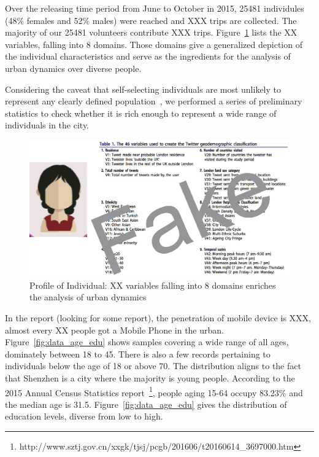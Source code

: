 Over the releasing time period from June to October in 2015, 25481 individules (48\% females and 52\% males) were reached and XXX trips are collected. The majority of our 25481 volunteers contribute XXX trips. Figure~\ref{fig:data_over} lists the XX variables, falling into 8 domains. Those domains give a generalized depiction of the individual characteristics and serve as the ingredients for the analysis of urban dynamics over diverse people. 

Considering the caveat that self-selecting individuals are most unlikely to represent any clearly defined population~\cite{Longley2015}, we performed a series of preliminary statistics to check whether it is rich enough to represent a wide range of individuals in the city.


\begin{figure}[htb!]
 \centering %
 \includegraphics[width=\columnwidth]{pictures/data_over}
 \caption{Profile of Individual: XX variables falling into 8 domains enriches the analysis of urban dynamics}
 \label{fig:data_over}
\end{figure}

In the report (looking for some report), the penetration of mobile device is XXX, almost every XX people got a Mobile Phone in the urban. Figure~\ref{fig:data_age_edu} shows samples covering a wide range of all ages, dominately between 18 to 45. There is also a few records pertaining to individuals below the age of 18 or above 70. The distribution aligns to the fact that Shenzhen is a city where the majority is young people. According to the 2015 Annual Census Statistics report~\footnote{http://www.sztj.gov.cn/xxgk/tjsj/pcgb/201606/t20160614\_3697000.htm}, people aging 15-64 occupy 83.23\% and the median age is 31.5. Figure~\ref{fig:data_age_edu} gives the distribution of education levels, diverse from low to high. 

